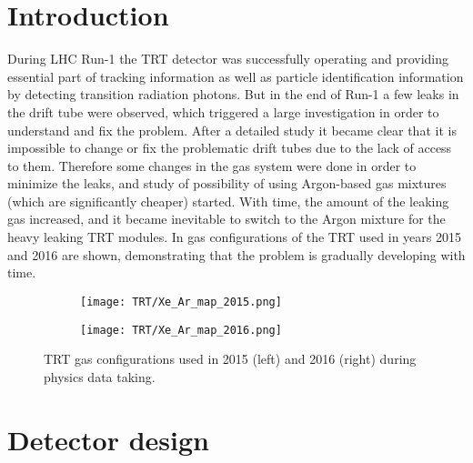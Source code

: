 \section{Introduction}
\label{sec:TRT_intro}

During LHC Run-1 the TRT detector was successfully operating and providing essential part of tracking information 
as well as particle identification information by detecting transition radiation photons. But in the end of Run-1 
a few leaks in the drift tube were observed, which triggered a large investigation in order to understand and fix the problem. 
After a detailed study it became clear that it is impossible to change or fix the problematic drift tubes 
due to the lack of access to them. Therefore some changes in the gas system were done in order to minimize the leaks, 
and study of possibility of using Argon-based gas mixtures (which are significantly cheaper) started. 
With time, the amount of the leaking gas increased, and it became inevitable to switch to the Argon mixture 
for the heavy leaking TRT modules. In  gas configurations of the TRT used 
in years 2015 and 2016 are shown, demonstrating that the problem is gradually developing with time.

\begin{figure}
\centering
\begin{subfigure}{.5\textwidth}
  \centering
  \texttt{[image: TRT/Xe\_Ar\_map\_2015.png]}
  \label{fig:sub1}
\end{subfigure}%
\begin{subfigure}{.5\textwidth}
  \centering
  \texttt{[image: TRT/Xe\_Ar\_map\_2016.png]}
  \label{fig:sub2}
\end{subfigure}
\caption{TRT gas configurations used in 2015 (left) and 2016 (right) during physics data taking.}
\label{fig:mixed_condition_2015_2016}
\end{figure}

\section{Detector design}
\label{sec:trt_straw_hw}

